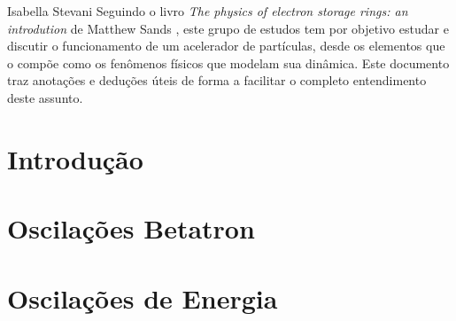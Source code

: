 \documentclass[a4paper, 12pt]{./Template/lnls-note-PT}
\numberwithin{equation}{section} %
\begin{document}
{Isabella Stevani}{\LNLS}
{Seguindo o livro \textit{The physics of electron storage rings: an introdution} de Matthew Sands \cite{sands1970physics}, este grupo de estudos tem por objetivo estudar e discutir o funcionamento de um acelerador de partículas, desde os elementos que o compõe como os fenômenos físicos que modelam sua dinâmica. Este documento traz anotações e deduções úteis de forma a facilitar o completo entendimento deste assunto.}

\newpage
\setcounter{page}{2}
\tableofcontents

\newpage
\section{Introdução}
    
    
    \pagebreak
  
\section{Oscilações Betatron}
	
    
    
    
    
    
    
	
	
	
	
	\pagebreak
	
\section{Oscilações de Energia}
	
	



\newpage

\end{document}
